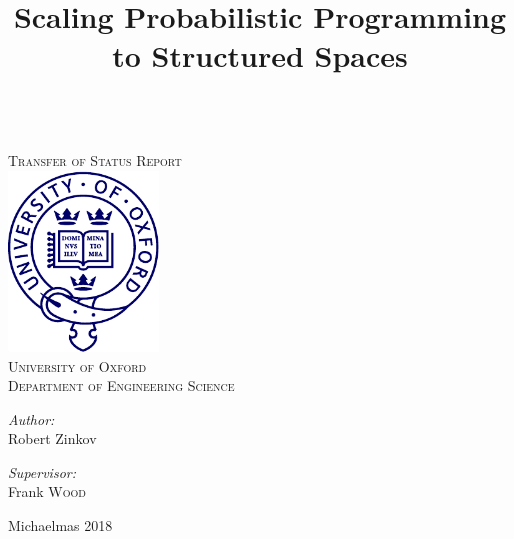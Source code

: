 \documentclass[12pt]{article}
\title{\vspace{-50pt} Scaling Probabilistic Programming to Structured Spaces}
\author{}
\date{}
\theoremstyle{definition}
\begin{document}
\begin{titlepage}
\begin{center}

~\\[2cm]

\textsc{\LARGE Transfer of Status Report}\\[2cm]

\includegraphics[width=0.3\textwidth]{oxford.pdf}\\[2cm]

\textsc{\Large University of Oxford}\\
\textsc{\Large Department of Engineering Science}\\[2cm]


\begin{minipage}{0.4\textwidth}
\begin{flushleft} \large
\emph{Author:}\\
Robert Zinkov\\
\end{flushleft}
\end{minipage}
\begin{minipage}{0.4\textwidth}
\begin{flushright} \large
\emph{Supervisor:} \\
Frank \textsc{Wood}
\end{flushright}
\end{minipage}

\vfill

{\large Michaelmas 2018}

\end{center}
\end{titlepage}



\vspace{-2em}
\maketitle
\vspace{-5em}	
	
\end{document}
